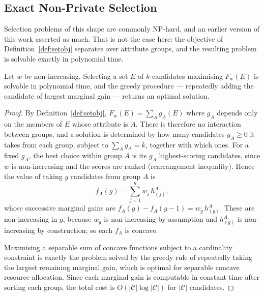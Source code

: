 \subsection{Exact Non-Private Selection}
\label{subsec:non-private-hardness}

Selection problems of this shape are commonly NP-hard, and an earlier version of this work asserted as much.
That is not the case here: the objective of Definition~\ref{def:setobj} separates over attribute groups, and the resulting problem is solvable exactly in polynomial time.

\begin{theorem}
\label{thm:non-private-hardness}
Let $w$ be non-increasing.
Selecting a set $E$ of $k$ candidates maximising $F_w(E)$ is solvable in polynomial time, and the greedy procedure --- repeatedly adding the candidate of largest marginal gain --- returns an optimal solution.
\end{theorem}

\begin{proof}
By Definition~\ref{def:setobj}, $F_w(E)=\sum_A g_A(E)$ where $g_A$ depends only on the members of $E$ whose attribute is $A$.
There is therefore no interaction between groups, and a solution is determined by how many candidates $g_A\ge0$ it takes from each group, subject to $\sum_A g_A=k$, together with which ones.
For a fixed $g_A$, the best choice within group $A$ is its $g_A$ highest-scoring candidates, since $w$ is non-increasing and the scores are ranked (rearrangement inequality).
Hence the value of taking $g$ candidates from group $A$ is
\[
f_A(g)=\sum_{j=1}^{g} w_j\, h^A_{(j)},
\]
whose successive marginal gains are $f_A(g)-f_A(g-1)=w_g\,h^A_{(g)}$.
These are non-increasing in $g$, because $w_g$ is non-increasing by assumption and $h^A_{(g)}$ is non-increasing by construction; so each $f_A$ is concave.

Maximising a separable sum of concave functions subject to a cardinality constraint is exactly the problem solved by the greedy rule of repeatedly taking the largest remaining marginal gain, which is optimal for separable concave resource allocation.
Since each marginal gain is computable in constant time after sorting each group, the total cost is $O(|\mathcal{C}|\log|\mathcal{C}|)$ for $|\mathcal{C}|$ candidates.
\end{proof}


